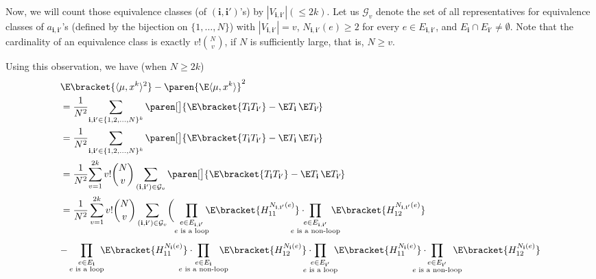 \documentclass{homework}
\begin{document}
{Now, we will count those equivalence classes (of $(\mathbf i,\mathbf i')$'s) by $|V_{\mathbf i,\mathbf i'}| (\le 2k)$. Let us $\mathcal G_v$ denote the set of all representatives for equivalence classes of $a_{\mathbf i,\mathbf i'}$'s (defined by the bijection on $\{1,\dots,N\}$) with $| V_{\mathbf i,\mathbf i'} | = v$, $N_{\mathbf i,\mathbf i'}(e)\ge 2$ for every $e\in E_{\mathbf i,\mathbf i'}$, and $E_{\mathbf i}\cap E_{\mathbf i'} \ne \emptyset$. Note that the cardinality of an equivalence class is exactly $v! \binom N v$, if $N$ is sufficiently large, that is, $N\ge v$.

Using this observation, we have (when $N\ge 2k$)
\begin{align*}
     & \E\bracket{\langle{\mu, x^k}\rangle^2} - \paren{\E\langle{\mu,x^k}\rangle}^2
    \\ &= \frac 1 {N^2} {\sum_{\mathbf i,\mathbf i' \in \{1,2,\dots,N\}^k }\paren[\big]{ \E\bracket{T_{\mathbf i}T_{\mathbf i'} } - \E T_{\mathbf i}\,\E T_{\mathbf i'\!}}}
    \\ &= \frac 1 {N^2} {\sum_{\mathbf i,\mathbf i' \in \{1,2,\dots,N\}^k }\paren[\big]{ \E\bracket{T_{\mathbf i}T_{\mathbf i'} } - \E T_{\mathbf i}\,\E T_{\mathbf i'\!}}}
    \\ &= \frac 1 {N^2} {\sum_{v=1}^{2k} v!\binom N v \sum_{(\mathbf i,\mathbf i') \in \mathcal G_v} \paren[\big]{ \E\bracket{T_{\mathbf i}T_{\mathbf i'} } - \E T_{\mathbf i}\,\E T_{\mathbf i'\!}}}
    \\ &= \frac 1 {N^2} \sum_{v=1}^{2k} v!\binom N v \sum_{(\mathbf i,\mathbf i') \in \mathcal G_v} \biggl(
        \prod_{\substack{e\in E_{\mathbf i,\mathbf i'} \\ \text{$e$ is a loop}}}\mkern-10mu \E\bracket{ H_{11}^{N_{\mathbf i,\mathbf i'} (e)} }\cdot \mkern-30mu\prod_{\substack{e\in E_{\mathbf i,\mathbf i'} \\ \text{$e$ is a non-loop}}} \mkern-20mu\E\bracket{ H_{12}^{N_{\mathbf i,\mathbf i'} (e)} } \biggr.
        \\&\biggl. - 
        \prod_{\substack{e\in E_{\mathbf i} \\ \text{$e$ is a loop}}} \mkern-10mu\E\bracket{ H_{11}^{N_{\mathbf i} (e)} }\cdot \mkern-30mu\prod_{\substack{e\in E_{\mathbf i} \\ \text{$e$ is a non-loop}}} \mkern-20mu\E\bracket{ H_{12}^{N_{\mathbf i} (e)} }\cdot \mkern-20mu
        \prod_{\substack{e\in E_{\mathbf i'} \\ \text{$e$ is a loop}}}\mkern-10mu \E\bracket{ H_{11}^{N_{\mathbf i} (e)} }\cdot \mkern-30mu\prod_{\substack{e\in E_{\mathbf i'} \\ \text{$e$ is a non-loop}}} \mkern-20mu\E\bracket{ H_{12}^{N_{\mathbf i} (e)} }

\end{align*}}
\end{document}
